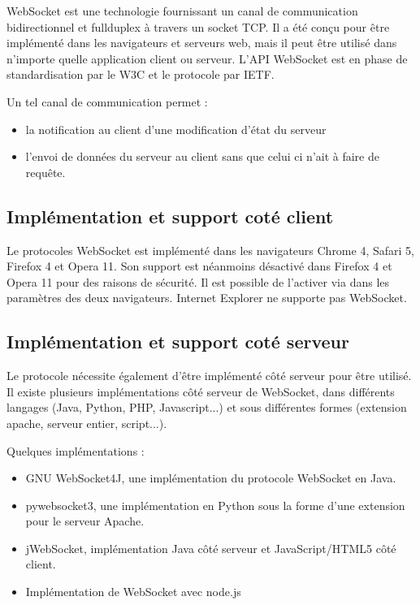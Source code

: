 \documentclass[a4paper,10pt]{report}
\begin{document}
WebSocket est une technologie fournissant un canal de communication bidirectionnel 
et fullduplex à travers un socket TCP. Il a été conçu pour être implémenté dans 
les navigateurs et serveurs web, mais il peut être utilisé dans n'importe quelle 
application client ou serveur. L'API WebSocket est en phase de standardisation 
par le W3C et le protocole par IETF.

Un tel canal de communication permet :

\begin{itemize}
  \item la notification au client d'une modification d'état du serveur
  \item l'envoi de données du serveur au client sans que celui ci n'ait à faire de requête.
\end{itemize}

    \subsection{Implémentation et support coté client}

Le protocoles WebSocket est implémenté dans les navigateurs Chrome 4, Safari 5, 
Firefox 4 et Opera 11. Son support est néanmoins désactivé dans Firefox 4 et 
Opera 11 pour des raisons de sécurité. Il est possible de l'activer via dans les 
paramètres des deux navigateurs. Internet Explorer ne supporte pas WebSocket.


    \subsection{Implémentation et support coté serveur}

Le protocole nécessite également d'être implémenté côté serveur pour être 
utilisé. Il existe plusieurs implémentations côté serveur de WebSocket, 
dans différents langages (Java, Python, PHP, Javascript...) et sous 
différentes formes (extension apache, serveur entier, script...).

Quelques implémentations :

\begin{itemize}
  \item GNU WebSocket4J, une implémentation du protocole WebSocket en Java. 
  \item pywebsocket3, une implémentation en Python sous la forme d'une extension pour le serveur Apache.
  \item jWebSocket, implémentation Java côté serveur et JavaScript/HTML5 côté client.
  \item Implémentation de WebSocket avec node.js
\end{itemize}
\end{document}
